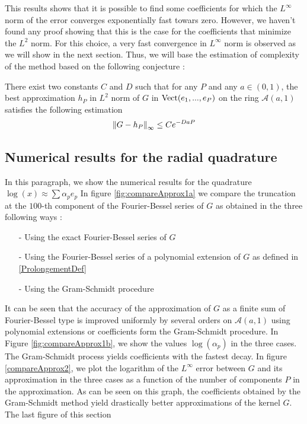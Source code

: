 \documentclass[11pt,a4paper]{article}
\begin{document}
This results shows that it is possible to find some coefficients for which the $L^\infty$ norm of the error converges exponentially fast towars zero. However, we haven't found any proof showing that this is the case for the coefficients that minimize the $L^2$ norm. For this choice, a very fast convergence in $L^\infty$ norm is observed as we will show in the next section. Thus, we will base the estimation of complexity of the method based on the following conjecture : 

\begin{Conj} There exist two constants $C$ and $D$ such that for any $P$ and any $a \in (0,1)$, the best approximation $h_P$ in $L^2$ norm of $G$ in $\textup{Vect}(e_1,...,e_P)$ on the ring $\mathcal{A}(a,1)$ satisfies the following estimation
\[ \left\|G - h_P\right\|_{\infty} \leq C e^{-DaP}\]
\label{Conj}
\end{Conj}

\subsection{Numerical results for the radial quadrature}

In this paragraph, we show the numerical results for the quadrature $\log(x) \approx \displaystyle \sum \alpha_p e_p$ 
In figure \ref{fig:compareApprox1a} we compare the truncation at the $100$-th component of the Fourier-Bessel series of $G$ as obtained in the three following ways : 
\begin{itemize}
\item[-] Using the exact Fourier-Bessel series of $G$
\item[-] Using the Fourier-Bessel series of a polynomial extension of $G$ as defined in \ref{ProlongementDef}
\item[-] Using the Gram-Schmidt procedure
\end{itemize}
It can be seen that the accuracy of the approximation of $G$ as a finite sum of Fourier-Bessel type is improved uniformly by several orders on $\mathcal{A}(a,1)$ using polynomial extensions or coefficients form the Gram-Schmidt procedure. In Figure \ref{fig:compareApprox1b}, we show the values $\log(\alpha_p)$ in the three cases. The Gram-Schmidt process yields coefficients with the fastest decay. 
In figure \ref{compareApprox2}, we plot the logarithm of the $L^{\infty}$ error between $G$ and its approximation in the three cases as a function of the number of components $P$ in the approximation. As can be seen on this graph, the coefficients obtained by the Gram-Schmidt method yield drastically better approximations of the kernel $G$. The last figure of this section 
\end{document}

